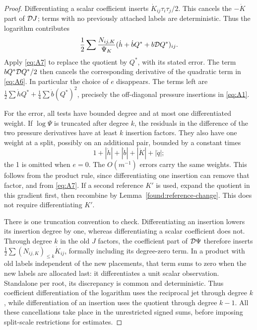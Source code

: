 \begin{proof}
Differentiating a scalar coefficient inserts
\(\dot K_{ij}\tau_i\tau_j/2\). This cancels the \(-\dot K\)
part of \({\cal D}J\); terms with no previously attached labels
are deterministic. Thus the logarithm contributes
\[
 \frac12\sum\frac{N_{ij,K}}{\Psi_K}
       (\dot h+\dot b Q^*+b{\cal D}Q^*)_{ij}.
\]
Apply \eqref{eq:A7} to replace the quotient by \(Q^*\), with its
stated error. The term \(bQ^*{\cal D}Q^*/2\) then cancels the
corresponding derivative of the quadratic term in \eqref{eq:A6}.
In particular the choice of \(e\) disappears. The terms left are
\(\frac12\sum\dot h Q^*+\frac14\sum\dot b(Q^*)^2\), precisely
the off-diagonal pressure insertions in \eqref{eq:A1}.

For the error, all tests have bounded degree and at most one
differentiated weight. If \(\log\Psi\) is truncated after degree
\(k\), the residuals in the difference of the two pressure derivatives
have at least \(k\) insertion factors. They also have one weight at
a split, possibly on an additional pair, bounded by a constant times
\[
 1+|\dot h|+|\dot b|+|\dot K|+|\dot q|;
\]
the 1 is omitted when \(e=0\). The \(O(m^{-1})\) errors carry the
same weights. This follows from the product rule, since differentiating
one insertion can remove that factor, and from \eqref{eq:A7}. If a
second reference \(K'\) is used, expand the quotient in this gradient
first, then recombine by Lemma~\ref{found:reference-change}. This does
not require differentiating \(K'\).

There is one truncation convention to check. Differentiating an
insertion lowers its insertion degree by one, whereas differentiating
a scalar coefficient does not. Through degree \(k\) in the old
\(J\) factors, the coefficient part of \({\cal D}\Psi\) therefore
inserts \(\frac12\sum(N_{ij,K})_{\le k}\dot K_{ij}\), formally
including its degree-zero term. In a product with old labels independent
of the new placements, that term sums to zero when the new labels are
allocated last: it differentiates a unit scalar observation. Standalone
per root, its discrepancy is common and deterministic. Thus coefficient
differentiation of the logarithm uses the reciprocal jet through degree
\(k\), while differentiation of an insertion uses the quotient through
degree \(k-1\). All these cancellations take place in the unrestricted
signed sums, before imposing split-scale restrictions for estimates.

\end{proof}

